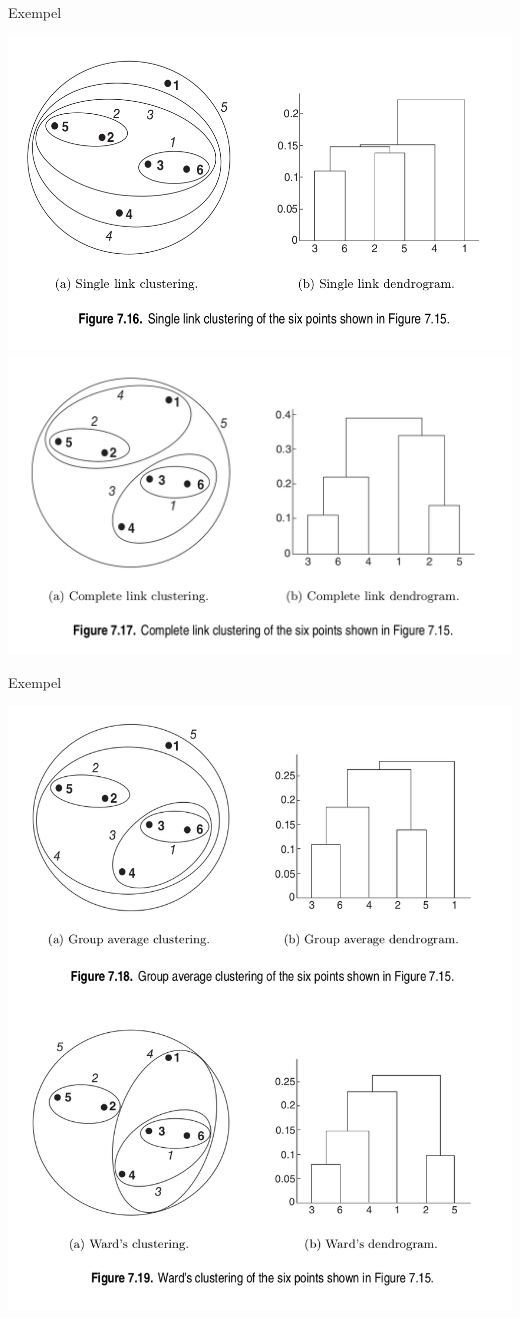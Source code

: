\documentclass[10pt,english]{beamer}
\begin{document}
\begin{frame}{Exempel}

    \includegraphics[width=.495\textwidth]{figs/Single link clustering.png} \includegraphics[width=.495\textwidth]{figs/Complete link clustering.png}
    
\end{frame}

\begin{frame}{Exempel}

    \includegraphics[scale=0.22]{figs/grouP_ward_clustering.png}
    
\end{frame}
\end{document}
